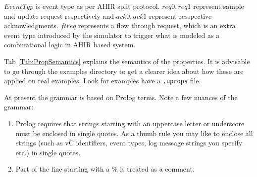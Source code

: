 \documentclass[12pt,a4paper]{article}
\begin{document}
$EventTyp$ is event type as per AHIR split protocol. $req0, req1$ represent sample and update request respectively and $ack0, ack1$ represent resspective acknowledgments. $ftreq$ represents a flow through request, which is an extra event type introduced by the simulator to trigger what is modeled as a combinational logic in AHIR based system.

Tab \ref{Tab:PropSemantics} explains the semantics of the properties. It is advisable to go through the examples directory to get a clearer idea about how these are applied on real examples. Look for examples have a \texttt{.uprops} file.

At present the grammar is based on Prolog terms. Note a few nuances of the grammar:

\begin{enumerate}
\item Prolog requires that strings starting with an uppercase letter or underscore must be enclosed in single quotes. As a thumb rule you may like to enclose all strings (such as vC identifiers, event types, log message strings you specify etc.) in single quotes.
\item Part of the line starting with a \% is treated as a comment.
\end{enumerate}
\end{document}
